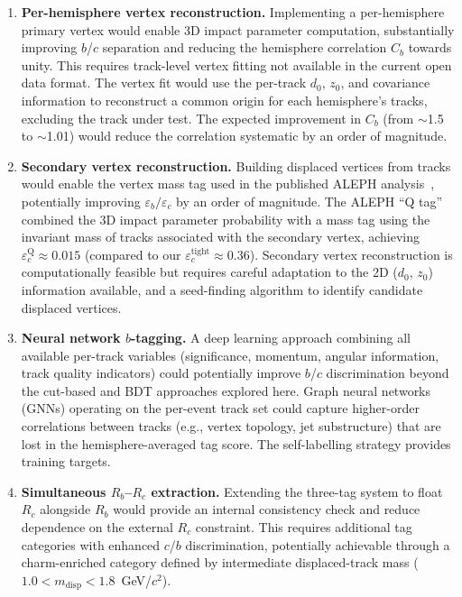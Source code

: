 \documentclass[11pt,a4paper]{article}
\begin{document}
\begin{enumerate}
\item \textbf{Per-hemisphere vertex reconstruction.}
  Implementing a per-hemisphere primary vertex would enable
  3D impact parameter computation, substantially improving
  $b$/$c$ separation and reducing the hemisphere correlation
  $C_b$ towards unity.
  This requires track-level vertex fitting not available in the
  current open data format.
  The vertex fit would use the per-track $d_0$, $z_0$, and
  covariance information to reconstruct a common origin for
  each hemisphere's tracks, excluding the track under test.
  The expected improvement in $C_b$ (from $\sim$1.5 to $\sim$1.01)
  would reduce the correlation systematic by an order of magnitude.

\item \textbf{Secondary vertex reconstruction.}
  Building displaced vertices from tracks would enable the
  vertex mass tag used in the published ALEPH
  analysis~\cite{ALEPH:Rb:1996}, potentially improving
  $\varepsilon_b/\varepsilon_c$ by an order of magnitude.
  The ALEPH ``Q tag'' combined the 3D impact parameter probability
  with a mass tag using the invariant mass of tracks associated
  with the secondary vertex, achieving $\varepsilon_c^\text{Q}
  \approx 0.015$ (compared to our $\varepsilon_c^\text{tight}
  \approx 0.36$).
  Secondary vertex reconstruction is computationally feasible
  but requires careful adaptation to the 2D ($d_0$, $z_0$)
  information available, and a seed-finding algorithm to identify
  candidate displaced vertices.

\item \textbf{Neural network $b$-tagging.}
  A deep learning approach combining all available per-track
  variables (significance, momentum, angular information, track
  quality indicators) could potentially improve $b$/$c$
  discrimination beyond the cut-based and BDT approaches explored
  here.
  Graph neural networks (GNNs) operating on the per-event track
  set could capture higher-order correlations between tracks
  (e.g., vertex topology, jet substructure) that are lost in the
  hemisphere-averaged tag score.
  The self-labelling strategy provides training targets.

\item \textbf{Simultaneous $R_b$--$R_c$ extraction.}
  Extending the three-tag system to float $R_c$ alongside $R_b$
  would provide an internal consistency check and reduce
  dependence on the external $R_c$ constraint.
  This requires additional tag categories with enhanced $c$/$b$
  discrimination, potentially achievable through a charm-enriched
  category defined by intermediate displaced-track mass
  ($1.0 < m_\text{disp} < 1.8$~GeV/$c^2$).


\end{enumerate}
\end{document}
